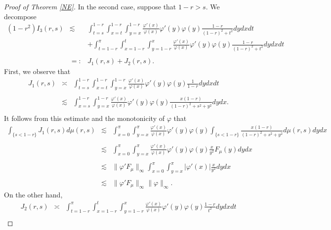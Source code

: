 \documentclass[12pt,reqno,a4paper]{amsart}
\numberwithin{equation}{section}
\begin{document}
\begin{proof}[Proof of Theorem \ref{NE}]
		In the second case, suppose that $1-r>s$. We decompose
		\[
		\begin{array}{lll}
			(1-r^2)I_3(r,s)& \lesssim & \displaystyle \int _{t=s}^{1-r}  \displaystyle \int _{x=t}^{1-r}   \displaystyle \int _{y=x}^{1-r}\frac{\varphi'(x)}{\varphi(x)}\varphi'(y)\varphi(y)\frac{1-r}{(1-r)^2+t^2}dydxdt\\
			& &+ \displaystyle \int _{t=1-r}^{\pi}  \displaystyle \int _{x=1-r}^{t}   \displaystyle \int ^{x}_{y=1-r}\frac{\varphi'(x)}{\varphi(x)}\varphi'(y)\varphi(y)\frac{1-r}{(1-r)^2+t^2}dydxdt\\
			\\
			& {=:}&  J_1(r,s)+J_2(r,s).
		\end{array}
		\]
		First, we observe that 
		\[
		\begin{array}{lll}
			J_1(r,s) & \asymp & \displaystyle \int _{t=s}^{1-r}  \displaystyle \int _{x=t}^{1-r}   \displaystyle \int _{y=x}^{1-r}\frac{\varphi'(x)}{\varphi(x)}\varphi'(y)\varphi(y)\frac{1}{1-r}dydxdt\\
			\\
			& \lesssim & \displaystyle \int _{x=s}^{1-r}  \displaystyle \int _{y=x}^{1-r}   \frac{\varphi'(x)}{\varphi(x)}\varphi'(y)\varphi(y)\frac{x(1-r)}{(1-r)^2+ s^2+y^2}dydx.\\
		\end{array}
		\] 
		It follows from this estimate and the monotonicity of $\varphi$ that
		\[
		\begin{array}{lll}
			\displaystyle \int_{\{ s< 1-r \}}J_1(r,s) d\mu(r,s)& \lesssim & \displaystyle \int _{x=0}^{\pi}  \displaystyle \int _{y=x}^{\pi}   \frac{\varphi'(x)}{\varphi(x)}\varphi'(y)\varphi(y)\displaystyle \int_{\{ s< 1-r \}} \frac{x(1-r)}{(1-r)^2+ s^2+y^2}d\mu(r,s)dydx\\
			\\
			& \lesssim & \displaystyle \int _{x=0}^{\pi}  \displaystyle \int _{y=x}^{\pi}   \frac{\varphi'(x)}{\varphi(x)}\varphi'(y)\varphi(y)\frac{x}{y^2}F_\mu(y)dydx\\
			\\
			& \lesssim & \|\varphi ' F_\mu\|_\infty \displaystyle \int _{x=0}^{\pi}  \displaystyle \int _{y=x}^{\pi}   |\varphi'(x)|\frac{x}{y^2}dydx\\
			\\
			& \lesssim & \|\varphi ' F_\mu\|_\infty \| \varphi \|_\infty.
		\end{array}
		\]
		On the other hand,
		\[
		\begin{array}{lll}
			J_2(r,s) & \asymp & \displaystyle \int _{t=1-r}^{\pi}  \displaystyle \int _{x=1-r}^{t}   \displaystyle \int _{y=1-r}^{x}\frac{\varphi'(x)}{\varphi(x)}\varphi'(y)\varphi(y)\frac{1-r}{t^2}dydxdt\\

\end{array}\]
\end{proof}
\end{document}
